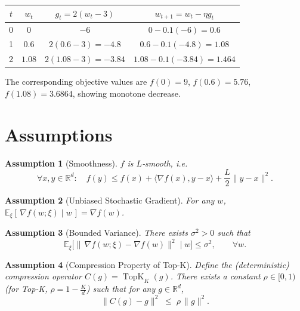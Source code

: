 \documentclass{article}
\newtheorem{assumption}{Assumption}
\newcommand{\TopK}[2]{\operatorname{TopK}_{#1}(#2)} %
\begin{document}
\begin{center}
\begin{tabular}{c|c|c|c}
$t$ & $w_t$ & $g_t=2(w_t-3)$ & $w_{t+1}=w_t-\eta g_t$ \\ \midrule
0 & $0$ & $-6$ & $0-0.1(-6)=0.6$ \\
1 & $0.6$ & $2(0.6-3)=-4.8$ & $0.6-0.1(-4.8)=1.08$ \\
2 & $1.08$ & $2(1.08-3)=-3.84$ & $1.08-0.1(-3.84)=1.464$ \\
\end{tabular}
\end{center}
The corresponding objective values are $f(0)=9$, $f(0.6)=5.76$, $f(1.08)=3.6864$, showing monotone decrease.

\newpage

\section*{Assumptions}
\begin{assumption}[Smoothness]\label{as:smooth}
$f$ is $L$‑smooth, i.e.
\[
\forall x,y\in\mathbb{R}^{d}:\quad
f(y)\le f(x)+\langle\nabla f(x),y-x\rangle+\frac{L}{2}\|y-x\|^{2}.
\]
\end{assumption}

\begin{assumption}[Unbiased Stochastic Gradient]\label{as:unbiased}
For any $w$, $\mathbb{E}_{\xi}[\,\nabla f(w;\xi)\mid w\,]=\nabla f(w)$.
\end{assumption}

\begin{assumption}[Bounded Variance]\label{as:variance}
There exists $\sigma^{2}>0$ such that
\[
\mathbb{E}_{\xi}\big[\|\,\nabla f(w;\xi)-\nabla f(w)\|^{2}\mid w\big]\le\sigma^{2},
\qquad\forall w.
\]
\end{assumption}

\begin{assumption}[Compression Property of Top‑K]\label{as:compress}
Define the (deterministic) compression operator $C(g)=\TopK{K}{g}$.  
There exists a constant $\rho\in[0,1)$ (for Top‑K, $\rho=1-\frac{K}{d}$) such that for any $g\in\mathbb{R}^{d}$,
\[
\|C(g)-g\|^{2}\;\le\;\rho\,\|g\|^{2}.
\tag{A4}
\]
\end{assumption}
\end{document}
